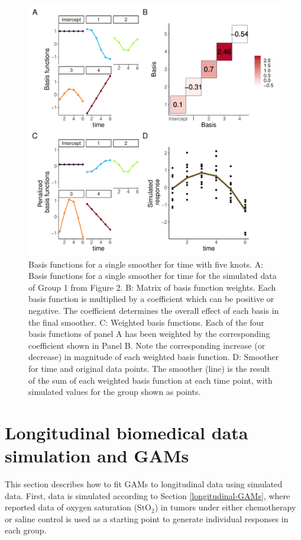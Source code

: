 \documentclass[
]{article}
\begin{document}
\begin{figure}[H]

{\centering \includegraphics[width=0.75\linewidth,]{00-Full_document_files/figure-latex/basis-plot-appendix-1} 

}

\caption{Basis functions for a single smoother for time with five knots. A: Basis functions for a single smoother for time for the simulated data of Group 1 from Figure 2. B: Matrix of basis function weights. Each basis function is multiplied by a coefficient which can be positive or negative. The coefficient determines the overall effect of each basis in the final smoother. C: Weighted basis functions. Each of the four basis functions of panel A has been weighted by the corresponding coefficient shown in Panel B. Note the corresponding increase (or decrease) in magnitude of each weighted basis function. D: Smoother for time and original data points. The smoother (line) is the result of the sum of each weighted basis function at each time point, with simulated values for the group shown as points.}\label{fig:basis-plot-appendix}
\end{figure}

\hypertarget{tumor-data-simulation}{%
\section{Longitudinal biomedical data simulation and GAMs}\label{tumor-data-simulation}}

This section describes how to fit GAMs to longitudinal data using simulated data. First, data is simulated according to Section \ref{longitudinal-GAMs}, where reported data of oxygen saturation (\(\mbox{StO}_2\)) in tumors under either chemotherapy or saline control is used as a starting point to generate individual responses in each group.
\end{document}
